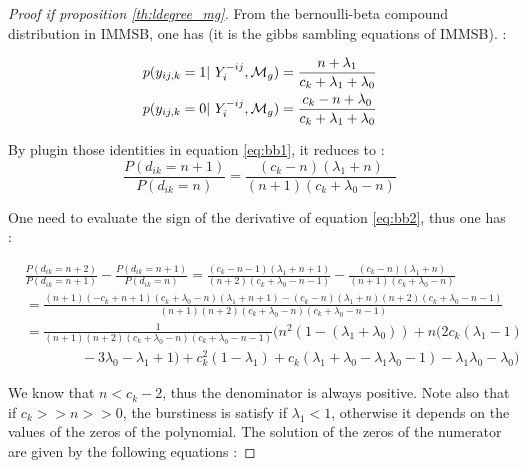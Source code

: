 \begin{proof}[Proof if proposition \ref{th:ldegree_mg}]
From the bernoulli-beta compound distribution in IMMSB, one has (it is the
gibbs sambling equations of IMMSB). : 

\begin{align}
    p(y_{ij,k}=1 | Y_i^{-ij}, \mg) = \frac{n+ \lambda_1}{c_k + \lambda_1 + \lambda_0}\\
    p(y_{ij,k}=0 | Y_i^{-ij}, \mg) = \frac{c_k - n + \lambda_0}{c_k + \lambda_1 + \lambda_0}
\end{align}

By plugin those identities in equation \eqref{eq:bb1}, it reduces to :
\begin{equation} \label{eq:bb2}
    \frac{P(d_{ik} = n+1)}{P(d_{ik} = n)} = \frac{\left(c_k - n\right) \left(\lambda_1
    + n\right)}{\left(n + 1\right) \left(c_k + \lambda_0 - n\right)}
\end{equation}


One need to evaluate the sign of the derivative of equation \eqref{eq:bb2}, thus one has :

\begin{align}
    &\frac{P(d_{ik} = n+2)}{P(d_{ik} = n+1)} - \frac{P(d_{ik} = n+1)}{P(d_{ik} = n)}
    = \frac{\left(c_k - n - 1\right) \left(\lambda_1 + n + 1\right)}{\left(n + 2\right) \left(c_k
    + \lambda_0 - n - 1\right)} - \frac{\left(c_k - n\right) \left(\lambda_1
    + n\right)}{\left(n + 1\right) \left(c_k + \lambda_0 - n\right)} \nonumber \\
    &= \frac{ \left(n + 1\right) \left(- c_k + n + 1\right) \left(c_k
    + \lambda_0 - n\right) \left(\lambda_1 + n + 1\right) - \left(c_k - n\right) \left(\lambda_1 + n\right) \left(n + 2\right) \left(c_k
    + \lambda_0 - n - 1\right)}{\left(n + 1\right) \left(n
    + 2\right) \left(c_k + \lambda_0 - n\right) \left(c_k + \lambda_0 - n - 1\right)} \nonumber \\
    &= \frac{1}{\left(n + 1\right) \left(n + 2\right) \left(c_k + \lambda_0 - n\right) \left(c_k + \lambda_0 - n - 1\right)} \biggl(n^2(1-(\lambda_1+\lambda_0))+n(2c_k(\lambda_1-1) \nonumber \\
    & \qquad \qquad  -3\lambda_0-\lambda_1+1) +c_k^2(1-\lambda_1)+c_k(\lambda_1+\lambda_0-\lambda_1\lambda_0-1)-\lambda_1\lambda_0-\lambda_0 \biggr)
\end{align}

We know that $n < c_k -2$, thus the denominator is always positive. Note also that if  $c_k >> n >> 0$, the
burstiness is satisfy if $\lambda_1 < 1$, otherwise it depends on the values of
the zeros of the polynomial. The solution of the zeros of the numerator are given by the following equations : 


\end{proof}
